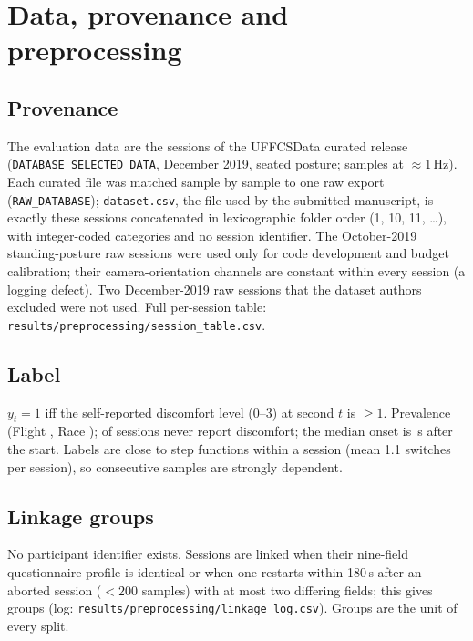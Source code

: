 \section{Data, provenance and preprocessing}
\label{sec:s-data}

\subsection{Provenance}
The evaluation data are the \nSessionsEval{} sessions of the UFFCSData curated release (\texttt{DATABASE\_SELECTED\_DATA}, December 2019, seated posture; \nSamplesEval{} samples at $\approx$1\,Hz). Each curated file was matched sample by sample to one raw export (\texttt{RAW\_DATABASE}); \texttt{dataset.csv}, the file used by the submitted manuscript, is exactly these sessions concatenated in lexicographic folder order (1, 10, 11, \ldots), with integer-coded categories and no session identifier. The \nSessionsDev{} October-2019 standing-posture raw sessions were used only for code development and budget calibration; their camera-orientation channels are constant within every session (a logging defect). Two December-2019 raw sessions that the dataset authors excluded were not used. Full per-session table: \texttt{results/\allowbreak preprocessing/\allowbreak session\_table.csv}.

\subsection{Label}
$y_t=1$ iff the self-reported discomfort level (0--3) at second $t$ is $\ge 1$. Prevalence \prevEval{} (Flight \prevFlight{}, Race \prevRace{}); \nNeverPos{} of \nSessionsEval{} sessions never report discomfort; the median onset is \onsetMedian\,s after the start. Labels are close to step functions within a session (mean 1.1 switches per session), so consecutive samples are strongly dependent.

\subsection{Linkage groups}
No participant identifier exists. Sessions are linked when their nine-field questionnaire profile is identical or when one restarts within 180\,s after an aborted session ($<200$ samples) with at most two differing fields; this gives \nGroupsEval{} groups (log: \texttt{results/\allowbreak preprocessing/\allowbreak linkage\_log.csv}). Groups are the unit of every split.


